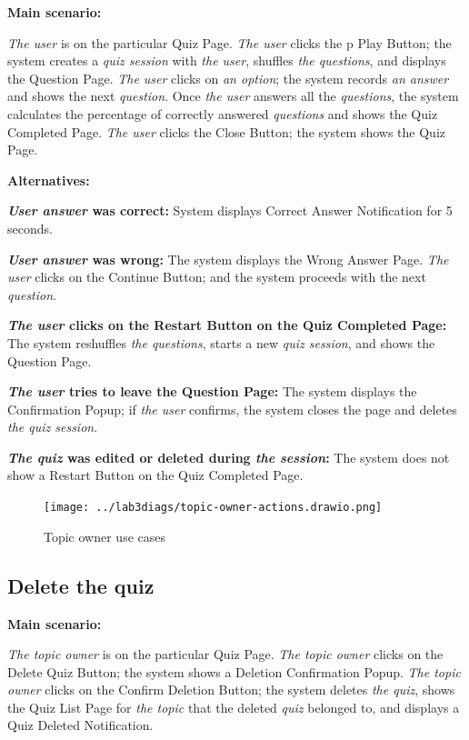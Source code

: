 \documentclass[
    english, %
]{VUMIFPSkursinis}
\begin{document}
\noindent\textbf{\fontsize{13}{15}\selectfont Main scenario:}

\textit{The user} is on the particular Quiz Page. \textit{The user} clicks the p
Play Button; the system creates a \textit{quiz session} with \textit{the user}, shuffles \textit{the questions}, and displays the Question Page. \textit{The user} clicks on \textit{an option}; the system records \textit{an answer} and shows the next \textit{question}. Once \textit{the user} answers all the \textit{questions}, the system calculates the percentage of correctly answered \textit{questions} and shows the Quiz Completed Page. \textit{The user} clicks the Close Button; the system shows the Quiz Page.

\noindent\textbf{\fontsize{13}{15}\selectfont Alternatives:}

\textbf{\textit{User answer} was correct:} System displays Correct Answer Notification for 5 seconds.

\textbf{\textit{User answer} was wrong:} The system displays the Wrong Answer Page. \textit{The user} clicks on the Continue Button; and the system proceeds with the next \textit{question}.

\textbf{\textit{The user} clicks on the Restart Button on the Quiz Completed Page:} The system reshuffles \textit{the questions}, starts a new \textit{quiz session}, and shows the Question Page.

\textbf{\textit{The user} tries to leave the Question Page:} The system displays the Confirmation Popup; if \textit{the user} confirms, the system closes the page and deletes \textit{the quiz session}.

\textbf{\textit{The quiz} was edited or deleted during \textit{the session}:} The system does not show a Restart Button on the Quiz Completed Page.

\begin{figure}[ht]
    \centering
    \texttt{[image: ../lab3diags/topic-owner-actions.drawio.png]}
    \caption{Topic owner use cases}
    \label{topic-owner}
\end{figure}

\subsection{Delete the quiz}

\noindent\textbf{\fontsize{13}{15}\selectfont Main scenario:}

\textit{The topic owner} is on the particular Quiz Page. \textit{The topic owner} clicks on the Delete Quiz Button; the system shows a Deletion Confirmation Popup. \textit{The topic owner} clicks on the Confirm Deletion Button; the system deletes \textit{the quiz}, shows the Quiz List Page for \textit{the topic} that the deleted \textit{quiz} belonged to, and displays a Quiz Deleted Notification.
\end{document}
